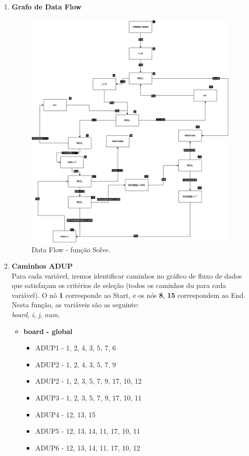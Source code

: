 \documentclass{article}
\begin{document}
\begin{itemize}
\begin{enumerate}
        \item \textbf{Grafo de Data Flow}
    \begin{figure}[H]
    \centering
    \includegraphics[width=\textwidth]{Images/DataFlowSudoku.png}
    \caption{Data Flow - função Solve.} 
    \label{fig:DataFlow-Solve}

    \end{figure}
    \item \textbf{Caminhos ADUP}\\
    
    Para cada variável, iremos identificar caminhos no gráfico de fluxo de dados que satisfaçam os critérios de seleção (todos os caminhos du
para cada variável).
O nó \textbf{1} corresponde ao Start, e os nós \textbf{8}, \textbf{15} correspondem ao End.
    Nesta função, as variáveis são as seguinte:\\
    \textit{board}, \textit{i}, \textit{j}, \textit{num}.
    \begin{itemize}
        \item \textbf{board - global }
        \begin{itemize}
            \item ADUP1 - 1, 2, 4, 3, 5, 7, 6
            \item ADUP2 - 1, 2, 4, 3, 5, 7, 9
            \item ADUP2 - 1, 2, 3, 5, 7, 9, 17, 10, 12
            \item ADUP3 - 1, 2, 3, 5, 7, 9, 17, 10, 11
            \item ADUP4 - 12, 13, 15
            \item ADUP5 - 12, 13, 14, 11, 17, 10, 11
            \item ADUP6 - 12, 13, 14, 11, 17, 10, 12


\end{itemize}
\end{itemize}
\end{enumerate}
\end{itemize}
\end{document}
